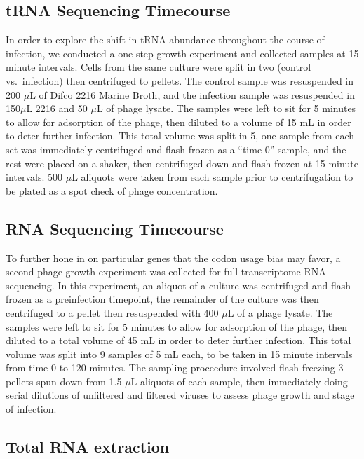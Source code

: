 \documentclass[12pt,twoside]{mitthesis-manusdown}
\begin{document}
\subsection{tRNA Sequencing
Timecourse}\label{trna-sequencing-timecourse}

In order to explore the shift in tRNA abundance throughout the course of
infection, we conducted a one-step-growth experiment and collected
samples at 15 minute intervals. Cells from the same culture were split
in two (control vs.~infection) then centrifuged to pellets. The control
sample was resuspended in 200 \(\mu\)L of Difco 2216 Marine Broth, and
the infection sample was resuspended in 150\(\mu\)L 2216 and 50 \(\mu\)L
of phage lysate. The samples were left to sit for 5 minutes to allow for
adsorption of the phage, then diluted to a volume of 15 mL in order to
deter further infection. This total volume was split in 5, one sample
from each set was immediately centrifuged and flash frozen as a ``time
0'' sample, and the rest were placed on a shaker, then centrifuged down
and flash frozen at 15 minute intervals. 500 \(\mu\)L aliquots were
taken from each sample prior to centrifugation to be plated as a spot
check of phage concentration.

\subsection{RNA Sequencing Timecourse}\label{rna-sequencing-timecourse}

To further hone in on particular genes that the codon usage bias may
favor, a second phage growth experiment was collected for
full-transcriptome RNA sequencing. In this experiment, an aliquot of a
culture was centrifuged and flash frozen as a preinfection timepoint,
the remainder of the culture was then centrifuged to a pellet then
resuspended with 400 \(\mu\)L of a phage lysate. The samples were left
to sit for 5 minutes to allow for adsorption of the phage, then diluted
to a total volume of 45 mL in order to deter further infection. This
total volume was split into 9 samples of 5 mL each, to be taken in 15
minute intervals from time 0 to 120 minutes. The sampling proceedure
involved flash freezing 3 pellets spun down from 1.5 \(\mu\)L aliquots
of each sample, then immediately doing serial dilutions of unfiltered
and filtered viruses to assess phage growth and stage of infection.

\subsection{Total RNA extraction}\label{total-rna-extraction}
\end{document}
